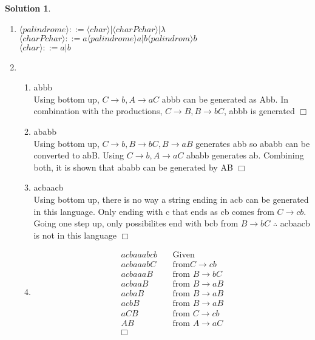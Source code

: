 \documentclass{article}
\theoremstyle{definition}
\newtheorem*{solution}{Solution}
\begin{document}
\begin{solution}\ \\
  \begin{enumerate}
    \item $\langle palindrome \rangle ::= \langle char \rangle \Big| \langle char P char \rangle \Big| \lambda$ \\
    $\langle char P char \rangle ::= a \langle palindrome \rangle a \Big| b \langle palindrom \rangle b $ \\
    $\langle char \rangle ::= a \Big| b$

    \item
      \begin{enumerate}
        \item abbb \\
          Using bottom up, $C \to b, A \to aC$ abbb can be generated as Abb. In combination with the productions, $C \to B, B \to bC$, abbb is generated $\Box$

        \item ababb \\
          Using bottom up, $C \to b, B \to bC, B \to aB$ generates abb so ababb can be converted to abB. Using $C \to b, A \to aC$ ababb generates ab. Combining both, it is shown that ababb can be generated by AB $\Box$

        \item acbaacb \\
          Using bottom up, there is no way a string ending in acb can be generated in this language. Only ending with c that ends as cb comes from $C \to cb$. Going one step up, only possibilites end with bcb from $B \to bC$ $\therefore$ acbaacb is not in this language $\Box$

        \item 
          \begin{align}
            acbaaabcb \quad & \text{Given}\\
            acbaaabC \quad & \text{from} C \to cb \\
            acbaaaB \quad & \text{from } B \to bC \\
            acbaaB \quad & \text{from } B \to aB \\
            acbaB \quad & \text{from } B \to aB \\
            acbB \quad & \text{from } B \to aB \\
            aCB \quad & \text{from } C \to cb \\
            AB \quad & \text{from } A \to aC \\
            \Box
          \end{align}
      \end{enumerate}
  \end{enumerate}
\end{solution}
\end{document}
